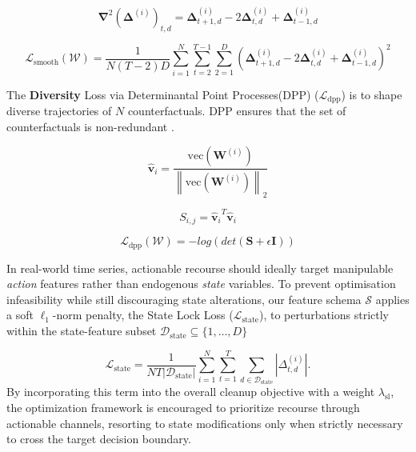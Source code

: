 \documentclass[runningheads]{llncs}
\begin{document}
	\begin{equation}
		\mathbf{\nabla}^2(\mathbf{\Delta}^{(i)})_{t, d} = \mathbf{\Delta}^{(i)}_{t+1, d} -2\mathbf{\Delta}^{(i)}_{t, d} + \mathbf{\Delta}^{(i)}_{t-1, d}
	\end{equation}
	
	\begin{equation}
		\mathcal{L}_{\text{smooth}}(\mathcal{W}) = \frac{1}{N(T-2)D} \sum_{i=1}^{N}\sum_{t=2}^{T-1}\sum_{2=1}^{D} (\mathbf{\Delta}^{(i)}_{t+1, d} -2\mathbf{\Delta}^{(i)}_{t, d} + \mathbf{\Delta}^{(i)}_{t-1, d})^2
	\end{equation}
	
	The \textbf{Diversity} Loss via Determinantal Point Processes(DPP) ($\mathcal{L}_{\text{dpp}}$) is to shape diverse trajectories of $N$ counterfactuals. DPP ensures that the set of counterfactuals is non-redundant \cite{Kulesza_2012} \cite{DiCE_Mothilal_2020}.
	
	\begin{equation}
		\hat{\mathbf{v}}_i = \frac{\text{vec}(\mathbf{W}^{(i)})}{\left\| \text{vec}(\mathbf{W}^{(i)}) \right\|_{2}} 
	\end{equation}
	
	\begin{equation}
		S_{i,j} = {\hat{\mathbf{v}}_i}^T \hat{\mathbf{v}}_i
	\end{equation}
	
	\begin{equation}
		\mathcal{L}_{\text{dpp}}(\mathcal{W}) = - log(det(\mathbf{S} + \epsilon \mathbf{I}))
	\end{equation}
	
	In real-world time series, actionable recourse should ideally target manipulable \textit{action} features rather than endogenous \textit{state} variables. To prevent optimisation infeasibility while still discouraging state alterations, our feature schema $\mathcal{S}$ applies a soft $\ell_1$-norm penalty, the State Lock Loss ($\mathcal{L}_{\mathrm{state}}$), to perturbations strictly within the state-feature subset $\mathcal{D}_{\mathrm{state}} \subseteq \{1, \dots, D\}$
	
	\begin{equation}
		\label{eq:state_lock_loss}
		\mathcal{L}_{\mathrm{state}} = \frac{1}{NT|\mathcal{D}_{\mathrm{state}}|} \sum_{i=1}^{N} \sum_{t=1}^{T} \sum_{d \in \mathcal{D}_{\mathrm{state}}} \left| \Delta_{t,d}^{(i)} \right|.
	\end{equation}
	By incorporating this term into the overall cleanup objective with a weight $\lambda_{\mathrm{sl}}$, the optimization framework is encouraged to prioritize recourse through actionable channels, resorting to state modifications only when strictly necessary to cross the target decision boundary.
	
\end{document}
